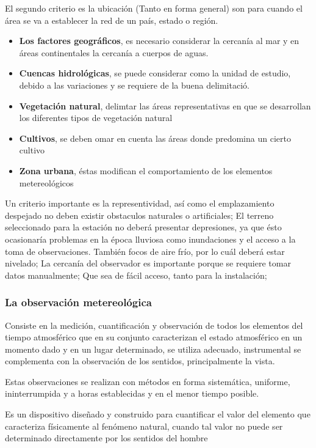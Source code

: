 El segundo criterio es la ubicación (Tanto en forma general) son para cuando el área se va a establecer la red de un país, estado o región.
\begin{itemize}
    \item \textbf{Los factores geográficos}, es necesario considerar la cercanía al mar y en áreas continentales la cercanía a cuerpos de aguas.
    \item \textbf{Cuencas hidrológicas}, se puede considerar como la unidad de estudio, debido a las variaciones y se requiere de la buena delimitació.
    \item \textbf{Vegetación natural}, delimtar las áreas representativas en que se desarrollan los diferentes tipos de vegetación natural
    \item \textbf{Cultivos}, se deben omar en cuenta las áreas donde predomina un cierto cultivo
    \item \textbf{Zona urbana}, éstas modifican el comportamiento de los elementos metereológicos
\end{itemize}
Un criterio importante es la representividad, así como el emplazamiento despejado no deben existir obstaculos naturales o artificiales; El terreno seleccionado para la estación no deberá presentar depresiones, ya que ésto ocasionaría problemas en la época lluviosa como inundaciones y el acceso a la toma de observaciones. También focos de aire frío, por lo cuál deberá estar nivelado; La cercanía del observador es importante porque se requiere tomar datos manualmente; Que sea de fácil acceso, tanto para la instalación; 

\subsubsection{La observación metereológica}

Consiste en la medición, cuantificación y observación de todos los elementos del tiempo atmosférico que en su conjunto caracterizan el estado atmosférico en un momento dado y en un lugar determinado, se utiliza adecuado, instrumental se complementa con la observación de los sentidos, principalmente la vista.

Estas observaciones se realizan con métodos en forma sistemática, uniforme, ininterrumpida y a horas establecidas y en el menor tiempo posible.

\begin{definition}
    Es un dispositivo diseñado y construido para cuantificar el valor del elemento que caracteriza físicamente al fenómeno natural, cuando tal valor no puede ser determinado directamente por los sentidos del hombre
\end{definition}

